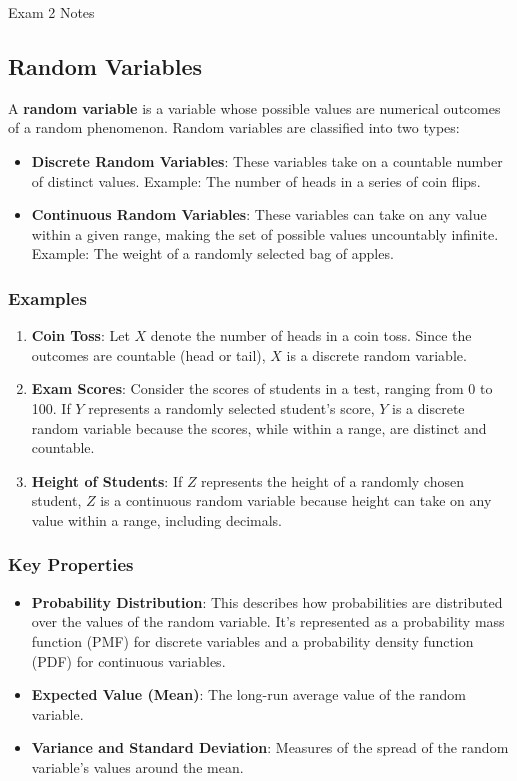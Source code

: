 \begin{examnotes}{Exam 2 Notes}
    \subsection*{Random Variables}

    A \textbf{random variable} is a variable whose possible values are numerical outcomes of a random phenomenon. Random variables are classified into two types:
    
    \begin{itemize}
        \item \textbf{Discrete Random Variables}: These variables take on a countable number of distinct values. Example: The number of heads in a series of coin flips.
        \item \textbf{Continuous Random Variables}: These variables can take on any value within a given range, making the set of possible values uncountably infinite. Example: The weight of a randomly 
        selected bag of apples.
    \end{itemize}
    
    \subsubsection*{Examples}
    
    \begin{enumerate}
        \item \textbf{Coin Toss}: Let $X$ denote the number of heads in a coin toss. Since the outcomes are countable (head or tail), $X$ is a discrete random variable.
        \item \textbf{Exam Scores}: Consider the scores of students in a test, ranging from 0 to 100. If $Y$ represents a randomly selected student's score, $Y$ is a discrete random variable because 
        the scores, while within a range, are distinct and countable.
        \item \textbf{Height of Students}: If $Z$ represents the height of a randomly chosen student, $Z$ is a continuous random variable because height can take on any value within a range, including decimals.
    \end{enumerate}
    
    \subsubsection*{Key Properties}
    
    \begin{itemize}
        \item \textbf{Probability Distribution}: This describes how probabilities are distributed over the values of the random variable. It's represented as a probability mass function (PMF) for 
        discrete variables and a probability density function (PDF) for continuous variables.
        \item \textbf{Expected Value (Mean)}: The long-run average value of the random variable.
        \item \textbf{Variance and Standard Deviation}: Measures of the spread of the random variable's values around the mean.
    \end{itemize}


\end{examnotes}
